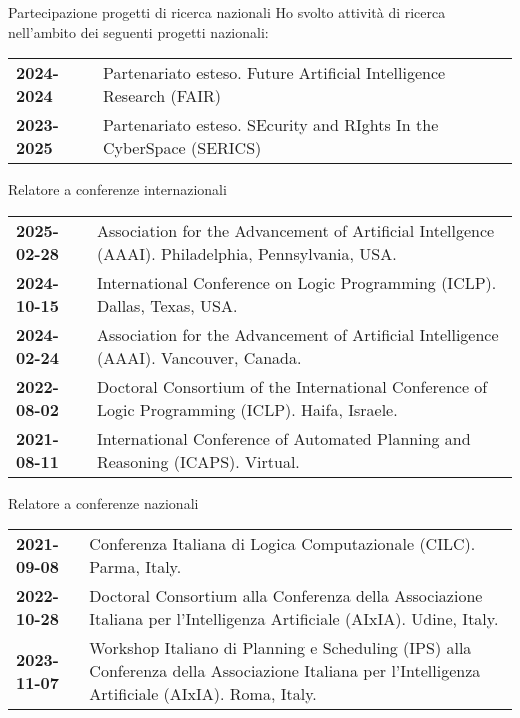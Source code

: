 \documentclass{resume} %
\begin{document}
\begin{rSection}{Partecipazione progetti di ricerca nazionali}
Ho svolto attività di ricerca nell'ambito dei seguenti progetti nazionali:\\
	\begin{tabularx}{0.95\textwidth} {lp{14cm}}
  \textbf{2024-2024} & Partenariato esteso. Future Artificial Intelligence Research (FAIR)\\
 \textbf{2023-2025} & Partenariato esteso. SEcurity and RIghts In the CyberSpace (SERICS)\\
 \end{tabularx}
\end{rSection}

\begin{rSection}{Relatore a conferenze internazionali}
	\begin{tabularx}{0.95\textwidth} {lp{14cm}}
 \textbf{2025-02-28} & Association for the Advancement of Artificial Intellgence (AAAI). Philadelphia, Pennsylvania, USA.\\
 \textbf{2024-10-15} & International Conference on Logic Programming (ICLP). Dallas, Texas, USA.\\
 \textbf{2024-02-24} & Association for the Advancement of Artificial Intelligence (AAAI). Vancouver, Canada.\\
 \textbf{2022-08-02} & Doctoral Consortium of the International Conference of Logic Programming (ICLP). Haifa, Israele.\\
 \textbf{2021-08-11} & International Conference of Automated Planning and Reasoning (ICAPS). Virtual.\\
 \end{tabularx}
 \end{rSection}
 

 \begin{rSection}{Relatore a conferenze nazionali}
	\begin{tabularx}{0.95\textwidth} {lp{14cm}}
 \textbf{2021-09-08} & Conferenza Italiana di Logica Computazionale (CILC).  Parma, Italy.\\
 \textbf{2022-10-28} & Doctoral Consortium alla Conferenza della Associazione Italiana per l'Intelligenza Artificiale (AIxIA). Udine, Italy.\\
 \textbf{2023-11-07} & Workshop Italiano di Planning e Scheduling (IPS) alla Conferenza della Associazione Italiana per l'Intelligenza Artificiale (AIxIA). Roma, Italy.
  \end{tabularx}
 \end{rSection}
 
\end{document}
